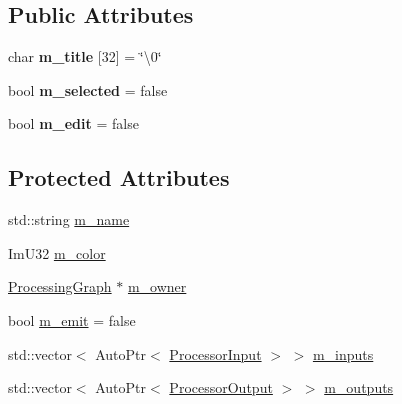 \subsection*{Public Attributes}
\begin{DoxyCompactItemize}
\item 
\mbox{\label{class_chill_1_1_processor_a948bfa8f4cfd3112f3da8b2ffa36bb7a}} 
char {\bfseries m\+\_\+title} \mbox{[}32\mbox{]} = \char`\"{}\textbackslash{}0\char`\"{}
\item 
\mbox{\label{class_chill_1_1_processor_abcba3bd72b99bbaeed8c715e0772fbda}} 
bool {\bfseries m\+\_\+selected} = false
\item 
\mbox{\label{class_chill_1_1_processor_ac82c72fce70c6b897c7fb61ec6108fc7}} 
bool {\bfseries m\+\_\+edit} = false
\end{DoxyCompactItemize}
\subsection*{Protected Attributes}
\begin{DoxyCompactItemize}
\item 
std\+::string \mbox{\hyperlink{class_chill_1_1_processor_aa6a9be29fed9833aef0c75259653bd20}{m\+\_\+name}}
\item 
Im\+U32 \mbox{\hyperlink{class_chill_1_1_processor_ae473cb6e402c7454ed4225c70da8de6c}{m\+\_\+color}}
\item 
\mbox{\hyperlink{class_chill_1_1_processing_graph}{Processing\+Graph}} $\ast$ \mbox{\hyperlink{class_chill_1_1_processor_a2b83d506f9923cb479d553f90acd2a02}{m\+\_\+owner}}
\item 
bool \mbox{\hyperlink{class_chill_1_1_processor_afbe48b147ae854cca4b93dfb3e5f0e8a}{m\+\_\+emit}} = false
\item 
std\+::vector$<$ Auto\+Ptr$<$ \mbox{\hyperlink{class_chill_1_1_processor_input}{Processor\+Input}} $>$ $>$ \mbox{\hyperlink{class_chill_1_1_processor_a9843bceefbc8f8236f0e7a05427378c1}{m\+\_\+inputs}}
\item 
std\+::vector$<$ Auto\+Ptr$<$ \mbox{\hyperlink{class_chill_1_1_processor_output}{Processor\+Output}} $>$ $>$ \mbox{\hyperlink{class_chill_1_1_processor_a0d0fdbd5faed69b8293b7cd615d96f99}{m\+\_\+outputs}}
\end{DoxyCompactItemize}


